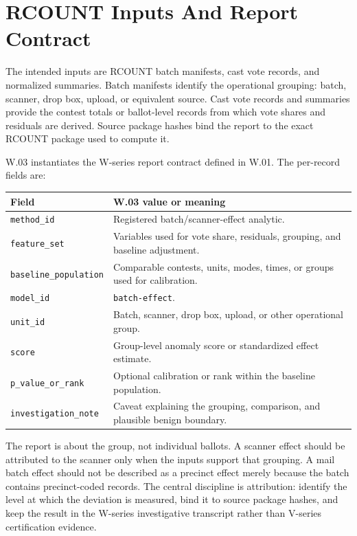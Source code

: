 \section{RCOUNT Inputs And Report Contract}

The intended inputs are RCOUNT batch manifests, cast vote records, and normalized
summaries. Batch manifests identify the operational grouping: batch, scanner,
drop box, upload, or equivalent source. Cast vote records and summaries provide
the contest totals or ballot-level records from which vote shares and residuals
are derived. Source package hashes bind the report to the exact RCOUNT package
used to compute it.

W.03 instantiates the W-series report contract defined in W.01. The per-record
fields are:

\begin{center}
\small
\begin{tabularx}{\textwidth}{lX}
\toprule
Field & W.03 value or meaning \\
\midrule
\texttt{method\_id} & Registered batch/scanner-effect analytic. \\
\texttt{feature\_set} & Variables used for vote share, residuals, grouping, and baseline adjustment. \\
\texttt{baseline\_population} & Comparable contests, units, modes, times, or groups used for calibration. \\
\texttt{model\_id} & \texttt{batch-effect}. \\
\texttt{unit\_id} & Batch, scanner, drop box, upload, or other operational group. \\
\texttt{score} & Group-level anomaly score or standardized effect estimate. \\
\texttt{p\_value\_or\_rank} & Optional calibration or rank within the baseline population. \\
\texttt{investigation\_note} & Caveat explaining the grouping, comparison, and plausible benign boundary. \\
\bottomrule
\end{tabularx}
\end{center}

The report is about the group, not individual ballots. A scanner effect should
be attributed to the scanner only when the inputs support that grouping. A mail
batch effect should not be described as a precinct effect merely because the
batch contains precinct-coded records. The central discipline is attribution:
identify the level at which the deviation is measured, bind it to source package
hashes, and keep the result in the W-series investigative transcript rather than
V-series certification evidence.
